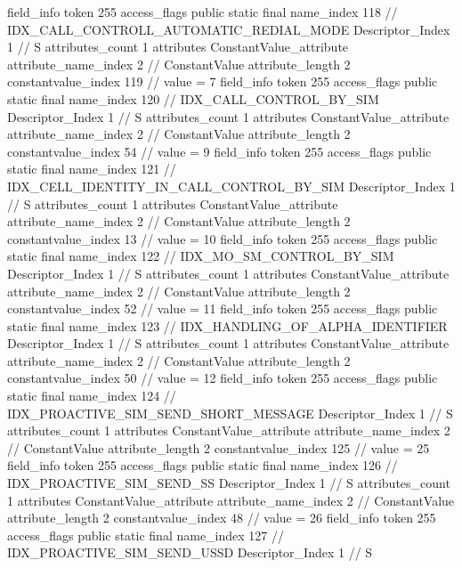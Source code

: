 {{{{{{{				}
				}
			}
			field_info {
				token	255
				access_flags	public static final
				name_index	118		// IDX_CALL_CONTROLL_AUTOMATIC_REDIAL_MODE
				Descriptor_Index	1		// S
				attributes_count	1
				attributes {
				ConstantValue_attribute {
					attribute_name_index	2		// ConstantValue
					attribute_length	2
					constantvalue_index	119		// value = 7
				}
				}
			}
			field_info {
				token	255
				access_flags	public static final
				name_index	120		// IDX_CALL_CONTROL_BY_SIM
				Descriptor_Index	1		// S
				attributes_count	1
				attributes {
				ConstantValue_attribute {
					attribute_name_index	2		// ConstantValue
					attribute_length	2
					constantvalue_index	54		// value = 9
				}
				}
			}
			field_info {
				token	255
				access_flags	public static final
				name_index	121		// IDX_CELL_IDENTITY_IN_CALL_CONTROL_BY_SIM
				Descriptor_Index	1		// S
				attributes_count	1
				attributes {
				ConstantValue_attribute {
					attribute_name_index	2		// ConstantValue
					attribute_length	2
					constantvalue_index	13		// value = 10
				}
				}
			}
			field_info {
				token	255
				access_flags	public static final
				name_index	122		// IDX_MO_SM_CONTROL_BY_SIM
				Descriptor_Index	1		// S
				attributes_count	1
				attributes {
				ConstantValue_attribute {
					attribute_name_index	2		// ConstantValue
					attribute_length	2
					constantvalue_index	52		// value = 11
				}
				}
			}
			field_info {
				token	255
				access_flags	public static final
				name_index	123		// IDX_HANDLING_OF_ALPHA_IDENTIFIER
				Descriptor_Index	1		// S
				attributes_count	1
				attributes {
				ConstantValue_attribute {
					attribute_name_index	2		// ConstantValue
					attribute_length	2
					constantvalue_index	50		// value = 12
				}
				}
			}
			field_info {
				token	255
				access_flags	public static final
				name_index	124		// IDX_PROACTIVE_SIM_SEND_SHORT_MESSAGE
				Descriptor_Index	1		// S
				attributes_count	1
				attributes {
				ConstantValue_attribute {
					attribute_name_index	2		// ConstantValue
					attribute_length	2
					constantvalue_index	125		// value = 25
				}
				}
			}
			field_info {
				token	255
				access_flags	public static final
				name_index	126		// IDX_PROACTIVE_SIM_SEND_SS
				Descriptor_Index	1		// S
				attributes_count	1
				attributes {
				ConstantValue_attribute {
					attribute_name_index	2		// ConstantValue
					attribute_length	2
					constantvalue_index	48		// value = 26
				}
				}
			}
			field_info {
				token	255
				access_flags	public static final
				name_index	127		// IDX_PROACTIVE_SIM_SEND_USSD
				Descriptor_Index	1		// S
}}}}}

